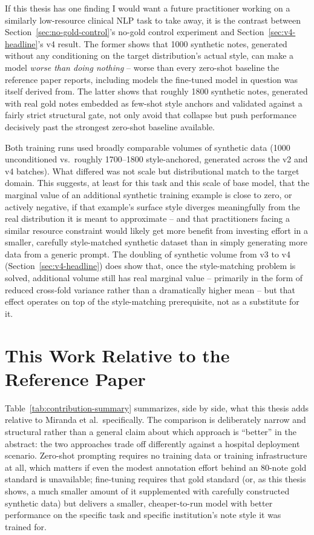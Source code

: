 \documentclass[12pt,a4paper]{report}
\begin{document}
If this thesis has one finding I would want a future practitioner working on a similarly low-resource clinical NLP task to take away, it is the contrast between Section~\ref{sec:no-gold-control}'s no-gold control experiment and Section~\ref{sec:v4-headline}'s v4 result. The former shows that 1000 synthetic notes, generated without any conditioning on the target distribution's actual style, can make a model \emph{worse than doing nothing} -- worse than every zero-shot baseline the reference paper reports, including models the fine-tuned model in question was itself derived from. The latter shows that roughly 1800 synthetic notes, generated with real gold notes embedded as few-shot style anchors and validated against a fairly strict structural gate, not only avoid that collapse but push performance decisively past the strongest zero-shot baseline available.

Both training runs used broadly comparable volumes of synthetic data (1000 unconditioned vs.\ roughly 1700--1800 style-anchored, generated across the v2 and v4 batches). What differed was not scale but distributional match to the target domain. This suggests, at least for this task and this scale of base model, that the marginal value of an additional synthetic training example is close to zero, or actively negative, if that example's surface style diverges meaningfully from the real distribution it is meant to approximate -- and that practitioners facing a similar resource constraint would likely get more benefit from investing effort in a smaller, carefully style-matched synthetic dataset than in simply generating more data from a generic prompt. The doubling of synthetic volume from v3 to v4 (Section~\ref{sec:v4-headline}) does show that, once the style-matching problem is solved, additional volume still has real marginal value -- primarily in the form of reduced cross-fold variance rather than a dramatically higher mean -- but that effect operates on top of the style-matching prerequisite, not as a substitute for it.

\section{This Work Relative to the Reference Paper}

Table~\ref{tab:contribution-summary} summarizes, side by side, what this thesis adds relative to Miranda et al.\ specifically. The comparison is deliberately narrow and structural rather than a general claim about which approach is ``better'' in the abstract: the two approaches trade off differently against a hospital deployment scenario. Zero-shot prompting requires no training data or training infrastructure at all, which matters if even the modest annotation effort behind an 80-note gold standard is unavailable; fine-tuning requires that gold standard (or, as this thesis shows, a much smaller amount of it supplemented with carefully constructed synthetic data) but delivers a smaller, cheaper-to-run model with better performance on the specific task and specific institution's note style it was trained for.
\end{document}
